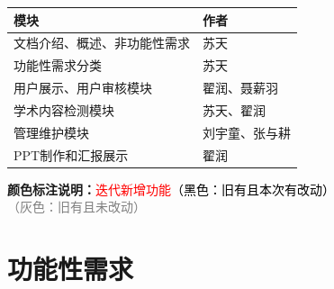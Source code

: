 \documentclass[UTF8]{ctexart}
\newcommand{\iternew}[1]{\textcolor{red}{#1}}
\newcommand{\legacyold}[1]{\textcolor{gray}{#1}}
\begin{document}
\begin{center}
\renewcommand{\arraystretch}{1.7}
\setlength{\tabcolsep}{18pt}

\begin{tabular}{|>{\centering\arraybackslash}p{8.2cm}|>{\centering\arraybackslash}p{3.2cm}|}
\hline
模块 & 作者 \\ \hline
文档介绍、概述、非功能性需求 & 苏天 \\ \hline
功能性需求分类 & 苏天 \\ \hline
用户展示、用户审核模块 & 翟润、聂薪羽 \\ \hline
学术内容检测模块 & 苏天、翟润 \\ \hline
管理维护模块 & 刘宇童、张与耕 \\ \hline
PPT制作和汇报展示 & 翟润 \\ \hline
\end{tabular}
\end{center}

\clearpage

\tableofcontents
\newpage

\noindent\textbf{颜色标注说明：}\iternew{迭代新增功能}\textcolor{black}{（黑色：旧有且本次有改动）}\legacyold{（灰色：旧有且未改动）}
\par
\vspace{0.5em}




\section{功能性需求}








\end{document}
